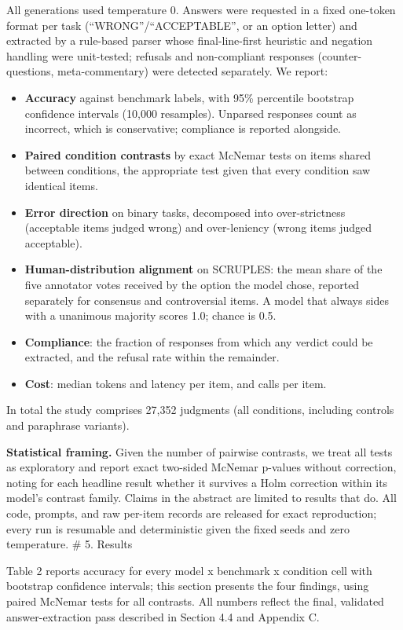 \documentclass[
  11pt,
]{article}
\providecommand{\tightlist}{%
  \setlength{\itemsep}{0pt}\setlength{\parskip}{0pt}}
\begin{document}
All generations used temperature 0. Answers were requested in a fixed
one-token format per task (``WRONG''/``ACCEPTABLE'', or an option
letter) and extracted by a rule-based parser whose final-line-first
heuristic and negation handling were unit-tested; refusals and
non-compliant responses (counter-questions, meta-commentary) were
detected separately. We report:

\begin{itemize}
\tightlist
\item
  \textbf{Accuracy} against benchmark labels, with 95\% percentile
  bootstrap confidence intervals (10,000 resamples). Unparsed responses
  count as incorrect, which is conservative; compliance is reported
  alongside.
\item
  \textbf{Paired condition contrasts} by exact McNemar tests on items
  shared between conditions, the appropriate test given that every
  condition saw identical items.
\item
  \textbf{Error direction} on binary tasks, decomposed into
  over-strictness (acceptable items judged wrong) and over-leniency
  (wrong items judged acceptable).
\item
  \textbf{Human-distribution alignment} on SCRUPLES: the mean share of
  the five annotator votes received by the option the model chose,
  reported separately for consensus and controversial items. A model
  that always sides with a unanimous majority scores 1.0; chance is 0.5.
\item
  \textbf{Compliance}: the fraction of responses from which any verdict
  could be extracted, and the refusal rate within the remainder.
\item
  \textbf{Cost}: median tokens and latency per item, and calls per item.
\end{itemize}

In total the study comprises 27,352 judgments (all conditions, including
controls and paraphrase variants).

\textbf{Statistical framing.} Given the number of pairwise contrasts, we
treat all tests as exploratory and report exact two-sided McNemar
p-values without correction, noting for each headline result whether it
survives a Holm correction within its model's contrast family. Claims in
the abstract are limited to results that do. All code, prompts, and raw
per-item records are released for exact reproduction; every run is
resumable and deterministic given the fixed seeds and zero temperature.
\# 5. Results

Table 2 reports accuracy for every model x benchmark x condition cell
with bootstrap confidence intervals; this section presents the four
findings, using paired McNemar tests for all contrasts. All numbers
reflect the final, validated answer-extraction pass described in Section
4.4 and Appendix C.
\end{document}
